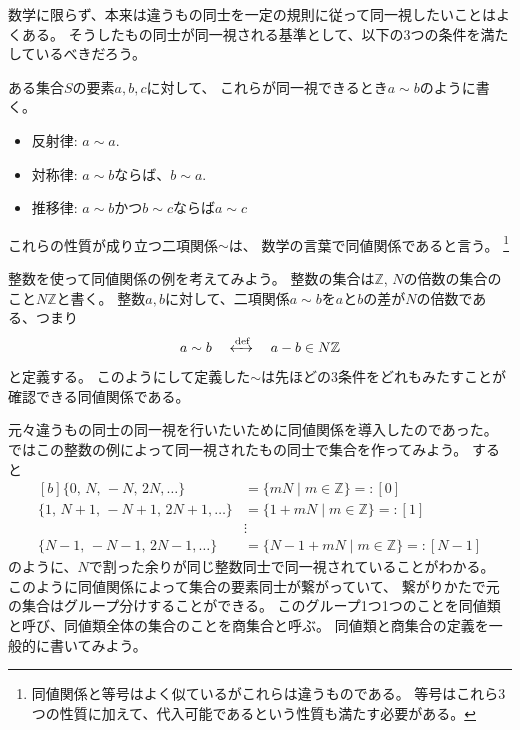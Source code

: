\documentclass[../master.tex]{subfiles}
\begin{document}
数学に限らず、本来は違うもの同士を一定の規則に従って同一視したいことはよくある。
そうしたもの同士が同一視される基準として、以下の3つの条件を満たしているべきだろう。
\begin{NoteBox}[title=同値関係]{}
    ある集合$S$の要素$a,b,c$に対して、
    これらが同一視できるとき$a\sim b$のように書く。
    \begin{itemize}
        \item 反射律: $a \sim a$.
        \item 対称律: $a \sim b$ならば、$b \sim a$.
        \item 推移律: $a \sim b$かつ$b \sim c$ならば$a \sim c$
    \end{itemize}
    これらの性質が成り立つ二項関係$\sim$は、
    数学の言葉で同値関係であると言う。
    \footnote{同値関係と等号はよく似ているがこれらは違うものである。
    等号はこれら3つの性質に加えて、代入可能であるという性質も満たす必要がある。}
\end{NoteBox}

整数を使って同値関係の例を考えてみよう。
整数の集合は$\mathbb{Z}$, $N$の倍数の集合のこと$N\mathbb{Z}$と書く。
整数$a,b$に対して、二項関係$a\sim b$を$a$と$b$の差が$N$の倍数である、つまり
\begin{equation}\begin{aligned}[b]
    a \sim b \quad \xleftrightarrow{\text{def}} \quad a - b \in N\mathbb{Z}
\end{aligned}\end{equation}
と定義する。
このようにして定義した$\sim$は先ほどの3条件をどれもみたすことが確認できる同値関係である。

元々違うもの同士の同一視を行いたいために同値関係を導入したのであった。
ではこの整数の例によって同一視されたもの同士で集合を作ってみよう。
すると
\begin{equation}\begin{aligned}[b]
    \{0,\, N,\,-N,\, 2N, \ldots\}&=\{mN\mid m\in \mathbb{Z}\}=:[0]\\
    \{1,\, N+1,\,-N+1,\, 2N+1, \ldots\}&=\{1+mN\mid m\in \mathbb{Z}\}=:[1]\\
    &\vdots \\
    \{N-1,\, -N-1,\,2N-1, \ldots\}&=\{N-1+mN\mid m\in \mathbb{Z}\}=:[N-1]
\end{aligned}\end{equation}
のように、$N$で割った余りが同じ整数同士で同一視されていることがわかる。
このように同値関係によって集合の要素同士が繋がっていて、
繋がりかたで元の集合はグループ分けすることができる。
このグループ1つ1つのことを同値類と呼び、同値類全体の集合のことを商集合と呼ぶ。
同値類と商集合の定義を一般的に書いてみよう。
\end{document}
